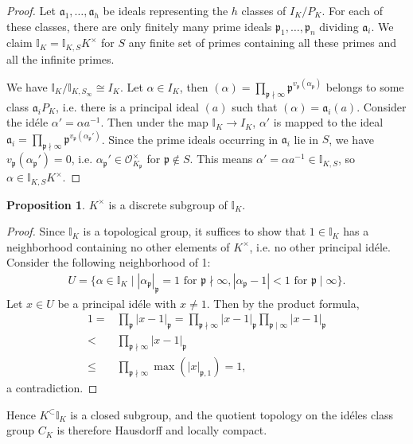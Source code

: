 \documentclass{article}
\theoremstyle{definition}
\newtheorem{prop}[theorem]{Proposition}
\begin{document}
\begin{proof}
    Let $\mathfrak{a}_1,\ldots,\mathfrak{a}_h$ be ideals representing the $h$ classes of $I_K/P_K$. For each of these classes, there are only finitely many prime ideals $\mathfrak{p}_1,\ldots,\mathfrak{p}_n$ dividing $\mathfrak{a}_i$. We claim $\mathbb{I}_K = \mathbb{I}_{K,S}K^\times$ for $S$ any finite set of primes containing all these primes and all the infinite primes.
    \vspace{1mm}
     
    We have $\mathbb{I}_K/\mathbb{I}_{K,S_{\infty}} \cong I_K$. Let $\alpha \in I_K$, then $(\alpha) = \prod_{\mathfrak{p}\nmid \infty}^{} \mathfrak{p}^{v_{\mathfrak{p}}(\alpha_{\mathfrak{p}})}$ belongs to some class $\mathfrak{a}_i P_K$, i.e. there is a principal ideal $(a)$ such that $(\alpha) = \mathfrak{a}_i (a)$. Consider the id\'ele $\alpha' = \alpha a^{-1}$. Then under the map $\mathbb{I}_K \to I_K$, $\alpha'$ is mapped to the ideal $\mathfrak{a}_i = \prod_{\mathfrak{p} \nmid \infty}^{} \mathfrak{p}^{v_{\mathfrak{p}}(\alpha_{\mathfrak{p}}')}$. Since the prime ideals occurring in $\mathfrak{a}_i$ lie in $S$, we have $v_{\mathfrak{p}}(\alpha_{\mathfrak{p}}') = 0$, i.e. $\alpha_{\mathfrak{p}}' \in \mathcal{O}_{K_{\mathfrak{p}}}^\times$ for $\mathfrak{p} \not\in S$. This means $\alpha' = \alpha a^{-1} \in \mathbb{I}_{K,S}$, so $\alpha \in \mathbb{I}_{K,S}K^\times$.
\end{proof}
\begin{prop}\label{prop4.10}
    $K^\times$ is a discrete subgroup of $\mathbb{I}_K$.
\end{prop}
\begin{proof}
    Since $\mathbb{I}_K$ is a topological group, it suffices to show that $1 \in \mathbb{I}_K$ has a neighborhood containing no other elements of $K^\times$, i.e. no other principal id\'ele. Consider the following neighborhood of 1:
    \begin{align*}
        U = \{\alpha \in \mathbb{I}_K \mid \left|\alpha_{\mathfrak{p}}\right|_{\mathfrak{p}}=1 \text{ for }\mathfrak{p}\nmid \infty, \left|\alpha_{\mathfrak{p}}-1\right|<1 \text{ for }\mathfrak{p} \mid \infty\}.
    \end{align*}
    Let $x \in U$ be a principal id\'ele with $x \neq 1$. Then by the product formula,
    \begin{align*}
        1 =& \prod_{\mathfrak{p}}^{} \left|x-1\right|_{\mathfrak{p}} = \prod_{\mathfrak{p}\nmid \infty}^{} \left|x-1\right|_{\mathfrak{p}} \prod_{\mathfrak{p} \mid \infty}^{} \left|x-1\right|_{\mathfrak{p}}\\
        <& \prod_{\mathfrak{p}\nmid \infty}^{} \left|x-1\right|_{\mathfrak{p}}\\
        \le & \prod_{\mathfrak{p}\nmid \infty}^{} \max(\left|x\right|_{\mathfrak{p},1}) = 1, 
    \end{align*}
    a contradiction.
\end{proof}
Hence $K^\subset \mathbb{I}_K$ is a closed subgroup, and the quotient topology on the id\'eles class group $C_K$ is therefore Hausdorff and locally compact.
\end{document}
